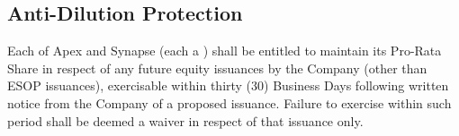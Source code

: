 \subsection{Anti-Dilution Protection}

Each of Apex and Synapse (each a ) shall be entitled
to maintain its Pro-Rata Share in respect of any future equity issuances by the
Company (other than ESOP issuances), exercisable within thirty (30) Business Days
following written notice from the Company of a proposed issuance.  Failure to
exercise within such period shall be deemed a waiver in respect of that issuance only.
